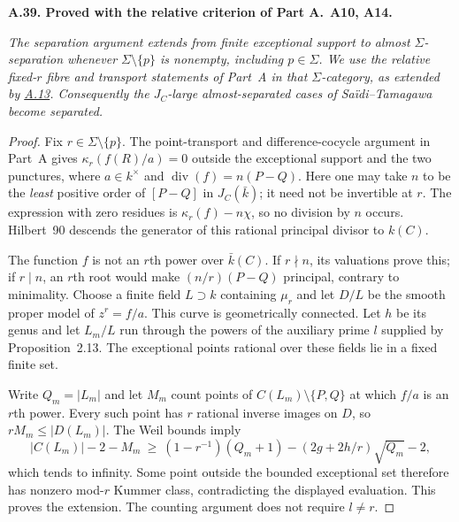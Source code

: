 \documentclass[11pt,a4paper]{article}
\newenvironment{claim}[3]{\par\medskip\noindent\hypertarget{#1}{\textbf{#1. #2.}}\ \textbf{#3.}\par\nopagebreak\smallskip\begingroup\itshape}{\endgroup\par\smallskip}
\newcommand{\statementref}[1]{\hyperlink{#1}{#1}}
\begin{document}
\begin{claim}{A.39}{Proved with the relative criterion of Part A}{A10, A14}
The separation argument extends from finite exceptional support to
almost $\Sigma$-separation whenever $\Sigma\setminus\{p\}$ is nonempty,
including $p\in\Sigma$. We use the relative fixed-$r$ fibre and
transport statements of Part~A in that $\Sigma$-category, as extended
by \statementref{A.13}. Consequently the $J_C$-large
almost-separated cases of Sa\"idi--Tamagawa become separated.
\end{claim}
\begin{proof}
Fix $r\in\Sigma\setminus\{p\}$. The point-transport and difference-cocycle argument
in Part~A gives
$\kappa_r(f(R)/a)=0$ outside the exceptional support and the two
punctures, where $a\in k^\times$ and
$\operatorname{div}(f)=n(P-Q)$. Here one may take $n$ to be the
\emph{least} positive order of $[P-Q]$ in $J_C(\bar k)$; it need not
be invertible at $r$. The expression with zero residues is
$\kappa_r(f)-n\chi$, so no division by $n$ occurs. Hilbert~90 descends
the generator of this rational principal divisor to $k(C)$.

The function $f$ is not an $r$th power over $\bar k(C)$. If $r\nmid n$,
its valuations prove this; if $r\mid n$, an $r$th root would make
$(n/r)(P-Q)$ principal, contrary to minimality. Choose a finite field
$L\supset k$ containing $\mu_r$ and let $D/L$ be the smooth proper
model of $z^r=f/a$. This curve is geometrically connected. Let $h$ be
its genus and let $L_m/L$ run through the powers of the auxiliary
prime $l$ supplied by Proposition~2.13. The exceptional points rational
over these fields lie in a fixed finite set.

Write $Q_m=|L_m|$ and let $M_m$ count points of
$C(L_m)\setminus\{P,Q\}$ at which $f/a$ is an $r$th power.
Every such point has $r$ rational inverse images on $D$, so
$rM_m\leq|D(L_m)|$. The Weil bounds imply
\[
 |C(L_m)|-2-M_m\ \geq\
 (1-r^{-1})(Q_m+1)-(2g+2h/r)\sqrt{Q_m}-2,
\]
which tends to infinity. Some point outside the bounded exceptional
set therefore has nonzero mod-$r$ Kummer class, contradicting the
displayed evaluation. This proves the extension. The counting argument
does not require $l\ne r$.
\end{proof}
\end{document}
